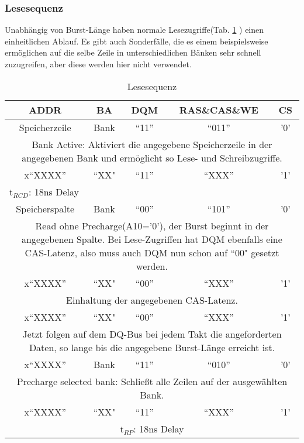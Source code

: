 \subsubsection*{Lesesequenz}
Unabhängig von Burst-Länge haben normale Lesezugriffe(Tab. \ref{tab:lese-seq} ) einen einheitlichen Ablauf. Es gibt auch Sonderfälle, die es einem beispielsweise ermöglichen auf die selbe Zeile in unterschiedlichen Bänken sehr schnell zuzugreifen, aber diese werden hier nicht verwendet.

\begin{table}[h!]
\caption{Lesesequenz}
\label{tab:lese-seq}
\centering
\setlength{\tabcolsep}{1ex}
\def\arraystretch{1.20}
\setlength{\tabcolsep}{1ex}
\small
\begin{tabularx}{\textwidth}{|ccccc|}
\hline 
ADDR & BA & DQM & RAS\&CAS\&WE & CS\\ 
\hline 
Speicherzeile & Bank & ``11'' & ``011'' & '0'\\
\multicolumn{5}{|X|}{Bank Active: Aktiviert die angegebene Speicherzeile in der angegebenen Bank und ermöglicht so Lese- und Schreibzugriffe.} \\ 
\hline 
x``XXXX'' & ``XX" & ``11'' & ``XXX'' & '1'  \\ 
\multicolumn{5}{|l|}{t$_{RCD}$: 18ns Delay} \\
\hline 
Speicherspalte & Bank & ``00'' & ``101'' & '0' \\
\multicolumn{5}{|X|}{Read ohne Precharge(A10='0'), der Burst beginnt in der angegebenen Spalte. Bei Lese-Zugriffen hat DQM ebenfalls eine CAS-Latenz, also muss auch DQM nun schon auf ``00" gesetzt werden.} \\ 
\hline 
x``XXXX'' & ``XX" & ``00'' & ``XXX'' & '1'\\ 
\multicolumn{5}{|X|}{Einhaltung der angegebenen CAS-Latenz.} \\
\hline 
x``XXXX'' & ``XX" & ``00'' & ``XXX'' & '1'\\ 
\multicolumn{5}{|X|}{Jetzt folgen auf dem DQ-Bus bei jedem Takt die angeforderten Daten, so lange bis die angegebene Burst-Länge erreicht ist.} \\
\hline 
x``XXXX'' & Bank & ``11'' & ``010'' & '0'\\ 
\multicolumn{5}{|X|}{Precharge selected bank: Schließt alle Zeilen auf der ausgewählten Bank.} \\
\hline 
x``XXXX'' & ``XX" & ``11'' & ``XXX'' & '1'\\ 
\multicolumn{5}{|X|}{t$_{RP}$: 18ns Delay} \\
\hline 
\end{tabularx} 
\end{table}
\FloatBarrier

